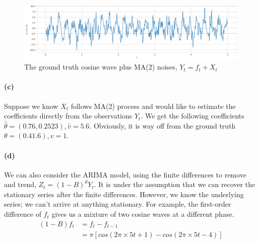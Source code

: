 \documentclass[11pt, letterpaper]{article}
\begin{document}
\begin{figure}[!h]
  \centering
  \includegraphics[width=1.0\textwidth]{plot2.png}
  \captionsetup{justification=centering}
  \caption{The ground truth cosine wave plus MA(2) noises, $Y_t = f_t + X_t$}
  \label{fig:truth_plus_noise}
\end{figure}

\paragraph{(c)}
Suppose we know $X_t$ follows MA(2) process and would like to estimate the coefficients directly from the observations $Y_t$. We get the following coefficients $\hat{\theta}=(0.76, 0.2523), \hat{v}=5.6$. Obviously, it is way off from the ground truth $\theta = (0.4 1.6), v=1$.

\paragraph{(d)}
We can also consider the ARIMA model, using the finite differences to remove and trend, $Z_t = (1-B)^d Y_t$. It is under the assumption that we can recover the stationary series after the finite differences. However, we know the underlying series; we can't arrive at anything stationary. For example, the first-order difference of $f_t$ gives us a mixture of two cosine waves at a different phase.
\begin{align*}
    (1-B)f_t &= f_t - f_{t-1} \\
        &= \pi [cos(2\pi \times 5t + 1) - cos(2\pi \times 5t - 4)]
\end{align*}
\end{document}
